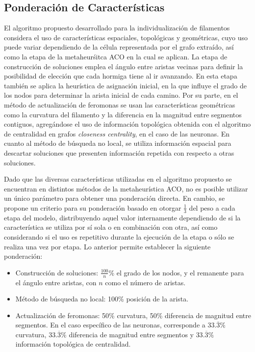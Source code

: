 \subsection{Ponderaci\'on de Caracter\'isticas}
\label{subsec:ponderacion}
El algoritmo propuesto desarrollado para la individualizaci\'on de filamentos considera el uso de caracter\'isticas espaciales, topol\'ogicas y geom\'etricas, cuyo uso puede variar dependiendo de la c\'elula representada por el grafo extra\'ido, as\'i como la etapa de la metaheur\'sitca ACO en la cual se aplican. La etapa de construcci\'on de soluciones emplea el \'angulo entre aristas vecinas para definir la posibilidad de elecci\'on que cada hormiga tiene al ir avanzando. En esta etapa tambi\'en se aplica la heur\'istica de asignaci\'on inicial, en la que influye el grado de los nodos para determinar la arista inicial de cada camino. Por su parte, en el m\'etodo de actualizaci\'on de feromonas se usan las caracter\'isticas geom\'etricas como la curvatura del filamento y la diferencia en la magnitud entre segmentos contiguos, agreg\'andose el uso de informaci\'on topol\'ogica obtenida con el algoritmo de centralidad en grafos {\it closeness centrality}, en el caso de las neuronas. En cuanto al m\'etodo de b\'usqueda no local, se utiliza informaci\'on espacial para descartar soluciones que presenten informaci\'on repetida con respecto a otras soluciones.


Dado que las diversas caracter\'isticas utilizadas en el algoritmo propuesto se encuentran en distintos m\'etodos de la metaheur\'istica ACO, no es posible utilizar un \'unico par\'ametro para obtener una ponderaci\'on directa. En cambio, se propone un criterio para su ponderaci\'on basado en otorgar $\frac{1}{3}$ del peso a cada etapa del modelo, distribuyendo aquel valor internamente dependiendo de si la caracter\'istica se utiliza por s\'i sola o en combinaci\'on con otra, as\'i como considerando si el uso es repetitivo durante la ejecuci\'on de la etapa o s\'olo se realiza una vez por etapa. Lo anterior permite establecer la siguiente ponderaci\'on:

\begin{itemize}
    \item Construcci\'on de soluciones: $\frac{100}{n}$\% el grado de los nodos, y el remanente para el \'angulo entre aristas, con $n$ como el n\'umero de aristas.
    \item M\'etodo de b\'usqueda no local: 100\% posici\'on de la arista.
    \item Actualizaci\'on de feromonas: 50\% curvatura, 50\% diferencia de magnitud entre segmentos. En el caso espec\'ifico de las neuronas, corresponde a $33.\overline{3}\%$ curvatura, $33.\overline{3}\%$ diferencia de magnitud entre segmentos y $33.\overline{3}\%$ informaci\'on topol\'ogica de centralidad.
\end{itemize}


